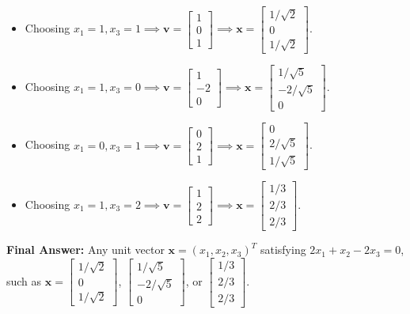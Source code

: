 \documentclass[11pt, letterpaper]{article}
\theoremstyle{definition}
\theoremstyle{remark}
\begin{document}
\begin{enumerate}[label=\textbf{Step \arabic*:}]
    \begin{itemize}
        \item Choosing $x_1 = 1, x_3 = 1 \implies \mathbf{v} = \begin{bmatrix} 1 \\ 0 \\ 1 \end{bmatrix} \implies \mathbf{x} = \begin{bmatrix} 1/\sqrt{2} \\ 0 \\ 1/\sqrt{2} \end{bmatrix}$.
        \item Choosing $x_1 = 1, x_3 = 0 \implies \mathbf{v} = \begin{bmatrix} 1 \\ -2 \\ 0 \end{bmatrix} \implies \mathbf{x} = \begin{bmatrix} 1/\sqrt{5} \\ -2/\sqrt{5} \\ 0 \end{bmatrix}$.
        \item Choosing $x_1 = 0, x_3 = 1 \implies \mathbf{v} = \begin{bmatrix} 0 \\ 2 \\ 1 \end{bmatrix} \implies \mathbf{x} = \begin{bmatrix} 0 \\ 2/\sqrt{5} \\ 1/\sqrt{5} \end{bmatrix}$.
        \item Choosing $x_1 = 1, x_3 = 2 \implies \mathbf{v} = \begin{bmatrix} 1 \\ 2 \\ 2 \end{bmatrix} \implies \mathbf{x} = \begin{bmatrix} 1/3 \\ 2/3 \\ 2/3 \end{bmatrix}$.
    \end{itemize}
\end{enumerate}
\textbf{Final Answer:} Any unit vector $\mathbf{x} = (x_1, x_2, x_3)^T$ satisfying $2x_1 + x_2 - 2x_3 = 0$, such as $\mathbf{x} = \begin{bmatrix} 1/\sqrt{2} \\ 0 \\ 1/\sqrt{2} \end{bmatrix}$, $\begin{bmatrix} 1/\sqrt{5} \\ -2/\sqrt{5} \\ 0 \end{bmatrix}$, or $\begin{bmatrix} 1/3 \\ 2/3 \\ 2/3 \end{bmatrix}$.
\end{document}
